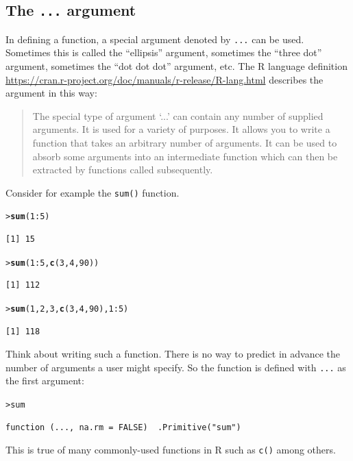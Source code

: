 \documentclass[12pt,oneside]{book}\usepackage[]{graphicx}\usepackage[]{color}
\makeatletter
\newcommand{\hlnum}[1]{\textcolor[rgb]{0.686,0.059,0.569}{#1}}%
\newcommand{\hlopt}[1]{\textcolor[rgb]{0,0,0}{#1}}%
\newcommand{\hlstd}[1]{\textcolor[rgb]{0.345,0.345,0.345}{#1}}%
\newcommand{\hlkwd}[1]{\textcolor[rgb]{0.737,0.353,0.396}{\textbf{#1}}}%
\newenvironment{kframe}{%
 \def\at@end@of@kframe{}%
 \ifinner\ifhmode%
  \def\at@end@of@kframe{\end{minipage}}%
  \begin{minipage}{\columnwidth}%
 \fi\fi%
 \def\FrameCommand##1{\hskip\@totalleftmargin \hskip-\fboxsep
 \colorbox{shadecolor}{##1}\hskip-\fboxsep
     \hskip-\linewidth \hskip-\@totalleftmargin \hskip\columnwidth}%
 \MakeFramed {\advance\hsize-\width
   \@totalleftmargin\z@ \linewidth\hsize
   \@setminipage}}%
 {\par\unskip\endMakeFramed%
 \at@end@of@kframe}
\newenvironment{knitrout}{}{} %
\newcommand{\Rfunc}[1]{\texttt{#1}}
\makeatother
\begin{document}
\subsection{The \texttt{...} argument}
In defining a function, a special argument denoted by \verb+...+ can be used. Sometimes this is called the ``ellipsis'' argument, sometimes the ``three dot'' argument, sometimes the ``dot dot dot'' argument, etc. The R language definition \url{https://cran.r-project.org/doc/manuals/r-release/R-lang.html} describes the argument in this way: 
\begin{quotation}
  The special type of argument `...' can contain any number of supplied arguments. It is used for a variety of purposes. It allows you to write a function that takes an arbitrary number of arguments. It can be used to absorb some arguments into an intermediate function which can then be extracted by functions called subsequently.
\end{quotation}
Consider for example the \Rfunc{sum()} function. 
\begin{knitrout}
\color{fgcolor}\begin{kframe}
\begin{alltt}
\hlstd{> }\hlkwd{sum}\hlstd{(}\hlnum{1}\hlopt{:}\hlnum{5}\hlstd{)}
\end{alltt}
\begin{verbatim}
[1] 15
\end{verbatim}
\begin{alltt}
\hlstd{> }\hlkwd{sum}\hlstd{(}\hlnum{1}\hlopt{:}\hlnum{5}\hlstd{,} \hlkwd{c}\hlstd{(}\hlnum{3}\hlstd{,} \hlnum{4}\hlstd{,} \hlnum{90}\hlstd{))}
\end{alltt}
\begin{verbatim}
[1] 112
\end{verbatim}
\begin{alltt}
\hlstd{> }\hlkwd{sum}\hlstd{(}\hlnum{1}\hlstd{,} \hlnum{2}\hlstd{,} \hlnum{3}\hlstd{,} \hlkwd{c}\hlstd{(}\hlnum{3}\hlstd{,} \hlnum{4}\hlstd{,} \hlnum{90}\hlstd{),} \hlnum{1}\hlopt{:}\hlnum{5}\hlstd{)}
\end{alltt}
\begin{verbatim}
[1] 118
\end{verbatim}
\end{kframe}
\end{knitrout}
Think about writing such a function. There is no way to predict in advance the number of arguments a user might specify. So the function is defined with \verb+...+ as the first argument:
\begin{knitrout}
\color{fgcolor}\begin{kframe}
\begin{alltt}
\hlstd{> }\hlstd{sum}
\end{alltt}
\begin{verbatim}
function (..., na.rm = FALSE)  .Primitive("sum")
\end{verbatim}
\end{kframe}
\end{knitrout}
This is true of many commonly-used functions in R such as \verb+c()+ among others. 
\end{document}
